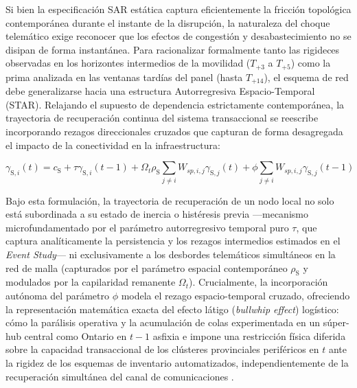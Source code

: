 Si bien la especificaci\'on SAR est\'atica captura eficientemente la fricci\'on topol\'ogica contempor\'anea durante el instante de la disrupci\'on, la naturaleza del choque telem\'atico exige reconocer que los efectos de congesti\'on y desabastecimiento no se disipan de forma instant\'anea. Para racionalizar formalmente tanto las rigideces observadas en los horizontes intermedios de la movilidad ($T_{+3}$ a $T_{+5}$) como la prima analizada en las ventanas tard\'ias del panel (hasta $T_{+14}$), el esquema de red debe generalizarse hacia una estructura Autorregresiva Espacio-Temporal (STAR). Relajando el supuesto de dependencia estrictamente contempor\'anea, la trayectoria de recuperaci\'on continua del sistema transaccional se reescribe incorporando rezagos direccionales cruzados que capturan de forma desagregada el impacto de la conectividad en la infraestructura:

\begin{equation}
\gamma_{\text{S},i}(t) = c_{\text{S}} + \tau \gamma_{\text{S},i}(t-1) + \Omega_t \rho_{\text{S}} \sum_{j \neq i} W_{sp,i,j}\gamma_{\text{S},j}(t) + \phi \sum_{j \neq i} W_{sp,i,j}\gamma_{\text{S},j}(t-1)
\end{equation}

Bajo esta formulaci\'on, la trayectoria de recuperaci\'on de un nodo local no solo est\'a subordinada a su estado de inercia o hist\'eresis previa ---mecanismo microfundamentado por el par\'ametro autorregresivo temporal puro $\tau$, que captura anal\'iticamente la persistencia y los rezagos intermedios estimados en el \textit{Event Study}--- ni exclusivamente a los desbordes telem\'aticos simult\'aneos en la red de malla (capturados por el par\'ametro espacial contempor\'aneo $\rho_{\text{S}}$ y modulados por la capilaridad remanente $\Omega_t$). Crucialmente, la incorporaci\'on aut\'onoma del par\'ametro $\phi$ modela el rezago espacio-temporal cruzado, ofreciendo la representaci\'on matem\'atica exacta del efecto l\'atigo (\textit{bullwhip effect}) log\'istico: c\'omo la par\'alisis operativa y la acumulaci\'on de colas experimentada en un s\'uper-hub central como Ontario en $t-1$ asfixia e impone una restricci\'on f\'isica diferida sobre la capacidad transaccional de los cl\'usteres provinciales perif\'ericos en $t$ ante la rigidez de los esquemas de inventario automatizados, independientemente de la recuperaci\'on simult\'anea del canal de comunicaciones \citep{carvalho2021supply}.

